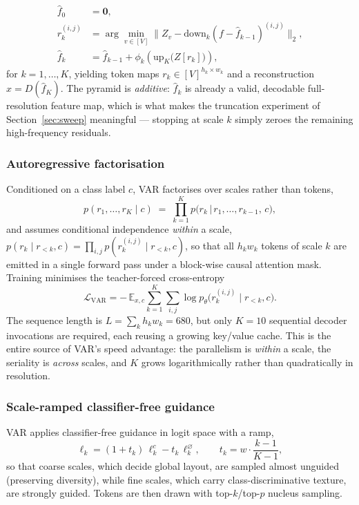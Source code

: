 \documentclass[conference]{IEEEtran}
\begin{document}
\begin{equation}
\begin{aligned}
\hat{f}_0 &= \mathbf{0}, \\
r_k^{(i,j)} &= \arg\min_{v \in [V]}
   \big\| Z_v - \mathrm{down}_k(f - \hat f_{k-1})^{(i,j)} \big\|_2, \\
\hat f_k &= \hat f_{k-1} + \phi_k\!\left(\mathrm{up}_K\big(Z[r_k]\big)\right),
\end{aligned}
\label{eq:rq}
\end{equation}
for $k = 1,\dots,K$, yielding token maps $r_k \in [V]^{h_k \times w_k}$ and a reconstruction
$\hat x = D(\hat f_K)$. The pyramid is \emph{additive}: $\hat f_k$ is already a valid,
decodable full-resolution feature map, which is what makes the truncation experiment of
Section~\ref{sec:sweep} meaningful --- stopping at scale $k$ simply zeroes the remaining
high-frequency residuals.

\subsubsection{Autoregressive factorisation}
Conditioned on a class label $c$, VAR factorises over scales rather than tokens,
\begin{equation}
p(r_1,\dots,r_K \mid c) \;=\; \prod_{k=1}^{K} p\big(r_k \,\big|\, r_1,\dots,r_{k-1},\, c\big),
\label{eq:var_factor}
\end{equation}
and assumes conditional independence \emph{within} a scale,
$p(r_k\mid r_{<k},c) = \prod_{i,j} p(r_k^{(i,j)} \mid r_{<k}, c)$, so that all $h_k w_k$
tokens of scale $k$ are emitted in a single forward pass under a block-wise causal attention
mask. Training minimises the teacher-forced cross-entropy
\begin{equation}
\mathcal{L}_{\mathrm{VAR}}
 = -\,\mathbb{E}_{x,c}\sum_{k=1}^{K}\sum_{i,j}
   \log p_\theta\big(r_k^{(i,j)} \mid r_{<k}, c\big).
\end{equation}
The sequence length is $L = \sum_k h_k w_k = 680$, but only $K{=}10$ sequential decoder
invocations are required, each reusing a growing key/value cache. This is the entire source
of VAR's speed advantage: the parallelism is \emph{within} a scale, the seriality is
\emph{across} scales, and $K$ grows logarithmically rather than quadratically in resolution.

\subsubsection{Scale-ramped classifier-free guidance}
VAR applies classifier-free guidance \cite{ho2022cfg} in logit space with a ramp,
\begin{equation}
\ell_k = (1+t_k)\,\ell_k^{c} - t_k\,\ell_k^{\varnothing},
\qquad t_k = w\cdot\frac{k-1}{K-1},
\label{eq:varcfg}
\end{equation}
so that coarse scales, which decide global layout, are sampled almost unguided (preserving
diversity), while fine scales, which carry class-discriminative texture, are strongly
guided. Tokens are then drawn with top-$k$/top-$p$ nucleus sampling.
\end{document}
